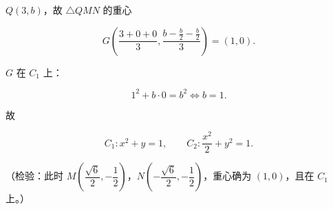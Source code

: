 \begin{answer}
$Q(3,b)$，故 $\triangle QMN$ 的重心

\nopagebreak[4]
\[G\left(\frac{3+0+0}3,\frac{b-\frac b2-\frac b2}3\right)=(1,0).\]

$G$ 在 $C_1$ 上：

\nopagebreak[4]
\[1^2+b\cdot0=b^2\iff b=1.\]

故

\nopagebreak[4]
\[C_1:x^2+y=1,\qquad C_2:\frac{x^2}2+y^2=1.\]

（检验：此时 $M\left(\dfrac{\sqrt6}2,-\dfrac12\right)$，$N\left(-\dfrac{\sqrt6}2,-\dfrac12\right)$，重心确为 $(1,0)$，且在 $C_1$ 上。）


\end{answer}
